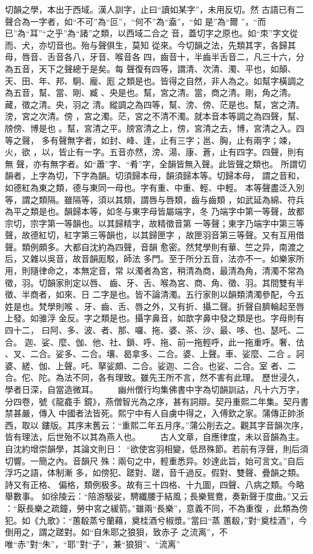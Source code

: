 \documentclass{ctexart}
\begin{document}
切韻之學，本出于西域。漢人訓字，止曰``讀如某字''，未用反切。然 古語已有二聲合為一字者，如``不可''為``叵''，``何不''為``盍''，``如 是''為``爾 ''，``而已''為``耳''``之乎''為``諸''之類，以西域二合之 音，蓋切字之原也。如``朿''字文從而、犬，亦切音也。殆与聲俱生，莫知 從來。今切韻之法，先類其字，各歸其母，唇音、舌音各八，牙音、喉音各 四，齒音十，半齒半舌音二，凡三十六，分為五音，天下之聲總于是矣。每 聲復有四等，謂清、次清、濁、平也，如顛、天、田、年、邦、駉、龐、厖 之類是也。皆得之自然，非人為之。如幫字橫調之為五音，幫、當、剛、臧 、央是也。幫，宮之清。當，商之清。剛，角之清。藏，徵之清。央，羽之 清。縱調之為四等，幫、滂、傍、茫是也。幫，宮之清。滂，宮之次清。傍 ，宮之濁。茫，宮之不清不濁。就本音本等調之為四聲，幫、牓傍、博是也 。幫，宮清之平。牓宮清之上，傍，宮清之去，博，宮清之入。四等之聲， 多有聲無字者，如封、峰、逢，止有三字；邕、胸，止有兩字；竦，火，欲 ，以，皆止有一字。五音亦然，滂、湯、康、蒼，止有四字。四聲，則有無 聲，亦有無字者。如``蕭''字、``肴''字，全韻皆無入聲。此皆聲之類也。 所謂切韻者，上字為切，下字為韻。切須歸本母，韻須歸本等。切歸本母， 謂之音和，如德紅為東之類，德与東同一母也。字有重、中重、輕、中輕。 本等聲盡泛入別等，謂之類隔。雖隔等，須以其類，謂唇与唇類，齒与齒類 ，如武延為綿、符兵為平之類是也。韻歸本等，如冬与東字母皆屬端字，冬 乃端字中第一等聲，故都宗切，宗字第一等韻也。以其歸精字，故精徵音第 一等聲；東字乃端字中第三等聲，故德紅切，紅字第三等韻也，以其歸匣字 ，故匣羽音第三等聲。又有互用借聲。類例頗多。大都自沈約為四聲，音韻 愈密。然梵學則有華、竺之异，南渡之后，又雜以吳音，故音韻厖駁，師法 多門。至于所分五音，法亦不一。如樂家所用，則隨律命之，本無定音，常 以濁者為宮，稍清為商，最清為角，清濁不常為徵，羽。切韻家則定以唇、 齒、牙、舌、喉為宮、商、角、徵、羽。其間雙有半徵、半商者，如來、日 二字是也。皆不論清濁。五行家則以韻類清濁參配，今五姓是也。梵學則喉 、牙、齒、舌、唇之外，又有折、攝二聲。折聲自臍輪起至唇上發。如骓浮 金反。字之類是也。攝字鼻音，如歆字鼻中發之類是也。字母則有四十二， 曰阿、多、波、者、那、囉、拖、婆、茶、沙、最、哆、也、瑟吒、二合。 迦、娑、麼、伽、他、社、鎖、呼、拖、前一拖輕呼，此一拖重呼。奢、佉 、叉、二合。娑多、二合。壤、曷拿多、二合。婆、上聲。車、娑麼、二合 。訶婆、縒、伽、上聲。吒、拏娑頗、二合。娑迦、二合。也娑、二合。室 者、二合。佗、陀。為法不同，各有理致。雖先王所不言，然不害有此理。 歷世浸久，學者日深，自當造微耳。 　　幽州僧行均集佛書中字為切韻訓詁，凡十六万字，分四卷，號《龍龕手 鏡》，燕僧智光為之序，甚有詞辯。契丹重熙二年集。契丹書禁甚嚴，傳入 中國者法皆死。熙宁中有人自虜中得之，入傅欽之家。蒲傳正帥浙西，取以 鏤版。其序末舊云：``重熙二年五月序。''蒲公削去之。觀其字音韻次序， 皆有理法，后世殆不以其為燕人也。 　　古人文章，自應律度，未以音韻為主。自沈約增崇韻學，其論文則日： ``欲使宮羽相變，低昂殊節。若前有浮聲，則后須切響。一簡之內。音韻尺 殊：兩句之中，輕重悉异。妙達此旨，始可言文。''自后浮巧之語，体制漸 多，如傍犯、蹉對、蹉，音千過反。假對、雙聲、疊韻之類。詩又有正格、 偏格，類例极多。故有三十四格、十九圖，四聲、八病之類。今略舉數事。 如徐陵云：``陪游馺娑，騁纖腰于結風；長樂鴛鴦，奏新聲于度曲。''又云 ：``厭長樂之疏鐘，勞中宮之緩箭。''雖兩``長樂''，意義不同，不為重復 ，此類為傍犯。如《九歌》：``蕙殽蒸兮蘭藉，奠桂酒兮椒漿。''當曰``蒸 蕙殽，''對``奠桂酒''，今倒用之，謂之蹉對。如``自朱耶之狼狽，致赤子 之流离''，不唯``赤''對``朱''，``耶''對``子''，兼``狼狽''、``流离'' 
\end{document}
